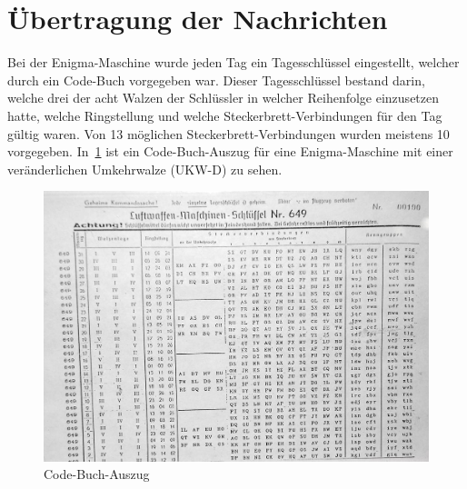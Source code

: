 
\section{Übertragung der Nachrichten}\label{sec:uebertragung-der-nachrichten}
Bei der Enigma-Maschine wurde jeden Tag ein Tagesschlüssel eingestellt, welcher durch ein Code-Buch vorgegeben war.
Dieser Tagesschlüssel bestand darin, welche drei der acht Walzen der Schlüssler in welcher Reihenfolge einzusetzen hatte, welche Ringstellung und welche Steckerbrett-Verbindungen für den Tag gültig waren.
Von 13 möglichen Steckerbrett-Verbindungen wurden meistens 10 vorgegeben.
In~\cref{fig:enigma_code_book} ist ein Code-Buch-Auszug für eine Enigma-Maschine mit einer veränderlichen Umkehrwalze (UKW-D) zu sehen.

\begin{figure}[htbp]
	\centering
	\includegraphics[width=.6\linewidth]{Enigma/Enigma-code-book}
	\caption{Code-Buch-Auszug\autocite{wiki:enigmacodebook}}
	\label{fig:enigma_code_book}
\end{figure}


